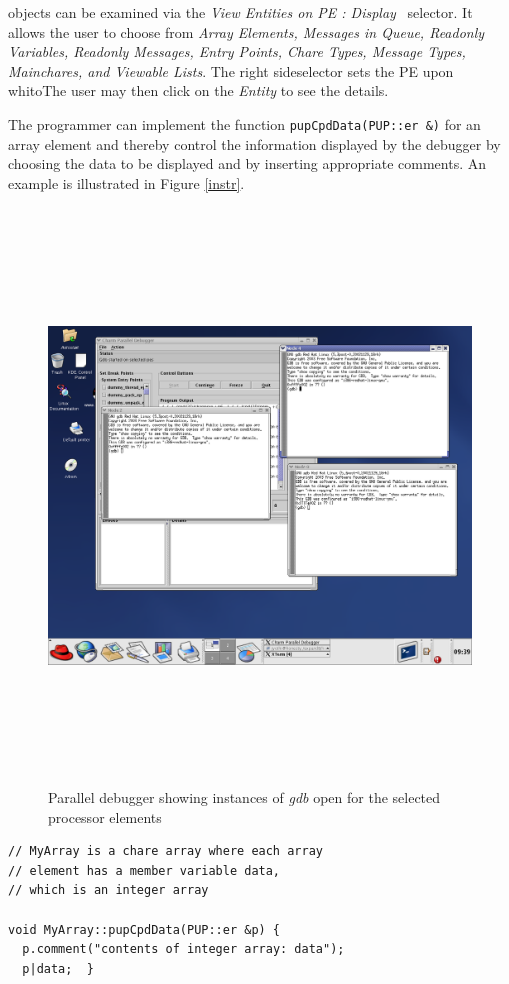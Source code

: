 \documentclass[10pt]{article}
\begin{document}
\charmpp{} objects can be examined via  the \textit{View Entities on PE : Display} \ selector.  It allows the user to choose from  \textit{Array Elements, Messages in Queue, Readonly Variables, Readonly Messages, Entry Points, Chare Types, Message Types, Mainchares, and Viewable Lists}.  The right sideselector sets the PE upon whitoThe user may then click on the \textit{Entity} to see the details. 

The programmer can implement the function \texttt{pupCpdData(PUP::er
\&)} for an array element and thereby control the information
displayed by the debugger by choosing the data to be displayed and by
inserting appropriate comments. An example is illustrated in Figure
\ref{instr}.

\begin{figure}[]
\includegraphics[scale=0.75,height=6in, width=6in]{figs/snapshot4}
\caption{Parallel debugger showing instances of \textit{gdb}
open for the selected processor elements}
\label{snapshot4}
\end{figure}

\begin{verbatim}
// MyArray is a chare array where each array
// element has a member variable data, 
// which is an integer array

void MyArray::pupCpdData(PUP::er &p) {
  p.comment("contents of integer array: data");
  p|data;  }
\end{verbatim}
\end{document}
